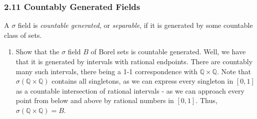 \documentclass[12pt,a4paper]{article}
\newcommand{\1}[1]{\mathbbm{1}\left\{ #1 \right\}}
\newcommand{\Q}{\mathbb{Q}}
\begin{document}
\subsubsection{2.11 Countably Generated Fields} A $\sigma$ field is \textit{countable generated}, or \textit{separable}, if it is generated by some countable class of sets.
\begin{enumerate}
	\item Show that the $\sigma$ field $B$ of Borel sets is countable generated. Well, we have that it is generated by intervals with rational endpoints. There are countably many such intervals, there being a 1-1 correspondence with $\Q \times \Q$. Note that $\sigma(\Q \times \Q)$ contains all singletons, as we can express every singleton in $[0,1]$ as a countable intersection of rational intervals - as we can approach every point from below and above by rational numbers in $[0,1]$. Thus, $\sigma(\Q \times \Q) = B$.
	

\end{enumerate}
\end{document}
